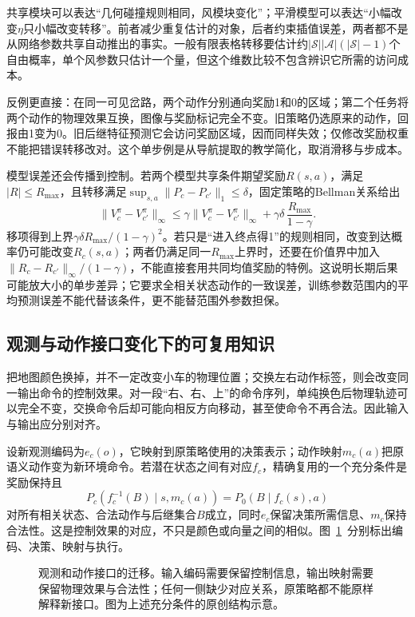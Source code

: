 共享模块可以表达“几何碰撞规则相同，风模块变化”；平滑模型可以表达“小幅改变$\eta$只小幅改变转移”。前者减少重复估计的对象，后者约束插值误差，两者都不是从网络参数共享自动推出的事实。一般有限表格转移要估计约$|\mathcal S||\mathcal A|(|\mathcal S|-1)$个自由概率，单个风参数只估计一个量，但这个维数比较不包含辨识它所需的访问成本。

反例更直接：在同一可见岔路，两个动作分别通向奖励1和0的区域；第二个任务将两个动作的物理效果互换，图像与奖励标记完全不变。旧策略仍选原来的动作，回报由1变为0。旧后继特征预测它会访问奖励区域，因而同样失效；仅修改奖励权重不能把错误转移改对。这个单步例是从导航提取的教学简化，取消滑移与步成本。

模型误差还会传播到控制。若两个模型共享条件期望奖励$R(s,a)$，满足$|R|\leq R_{\max}$，且转移满足$\sup_{s,a}\lVert P_c-P_{c'}\rVert_1\leq\delta$，固定策略的Bellman关系给出
\[
 \lVert V_c^\pi-V_{c'}^\pi\rVert_\infty
 \leq \gamma\lVert V_c^\pi-V_{c'}^\pi\rVert_\infty
      +\gamma\delta\,\frac{R_{\max}}{1-\gamma}.
\]
移项得到上界$\gamma\delta R_{\max}/(1-\gamma)^2$。若只是“进入终点得1”的规则相同，改变到达概率仍可能改变$R_c(s,a)$；两者仍满足同一$R_{\max}$上界时，还要在价值界中加入$\lVert R_c-R_{c'}\rVert_\infty/(1-\gamma)$，不能直接套用共同均值奖励的特例。这说明长期后果可能放大小的单步差异；它要求全相关状态动作的一致误差，训练参数范围内的平均预测误差不能代替该条件，更不能替范围外参数担保。

\subsection{观测与动作接口变化下的可复用知识}
\label{sec:rl-transfer-interface}

把地图颜色换掉，并不一定改变小车的物理位置；交换左右动作标签，则会改变同一输出命令的控制效果。对一段“右、右、上”的命令序列，单纯换色后物理轨迹可以完全不变，交换命令后却可能向相反方向移动，甚至使命令不再合法。因此输入与输出应分别对齐。

设新观测编码为$e_c(o)$，它映射到原策略使用的决策表示；动作映射$m_c(a)$把原语义动作变为新环境命令。若潜在状态之间有对应$f_c$，精确复用的一个充分条件是奖励保持且
\[
 P_c\!\left(f_c^{-1}(B)\mid s,m_c(a)\right)
 =P_0\!\left(B\mid f_c(s),a\right)
\]
对所有相关状态、合法动作与后继集合$B$成立，同时$e_c$保留决策所需信息、$m_c$保持合法性。这是控制效果的对应，不只是颜色或向量之间的相似。图~\ref{fig:rl-transfer-interface}~分别标出编码、决策、映射与执行。

\begin{figure}[t]
  \centering
  
  \caption{观测和动作接口的迁移。输入编码需要保留控制信息，输出映射需要保留物理效果与合法性；任何一侧缺少对应关系，原策略都不能原样解释新接口。图为上述充分条件的原创结构示意。}
  \label{fig:rl-transfer-interface}
\end{figure}

